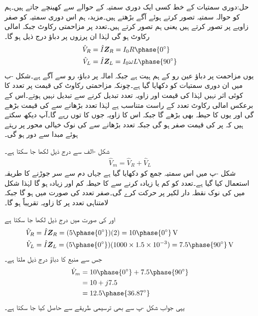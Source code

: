 حل:دوری سمتیات کے خط کسی ایک دوری سمتیہ کے حوالے سے کھینچے جاتے ہیں۔ہم  کو حوالہ سمتیہ تصور کرتے ہوئے آگے بڑھتے ہیں۔مزید، ہم اس دوری سمتیہ کو صفر زاویے پر تصور کرتے ہیں یعنی ہم  تصور کرتے ہیں۔تعدد  پر مزاحمتی رکاوٹ  جبکہ  امالی رکاوٹ  ہو گی لہٰذا ان پرزوں پر دباؤ درج ذیل ہو گا۔
\begin{align*}
\hat{V}_R&=\hat{I} \bZ_R=I_0 R \phase{0^{\circ}}\\
\hat{V}_L&=\hat{I} \bZ_L=I_0 \omega L \phase{90^{\circ}}
\end{align*}
یوں مزاحمت پر دباؤ عین رو کے ہم ہیت ہے جبکہ امالہ پر دباؤ، رو سے  آگے ہے۔شکل -ب میں ان دوری سمتیات کو دکھایا گیا ہے۔چونکہ مزاحمتی رکاوٹ کی قیمت پر تعدد کا کوئی اثر نہیں لہٰذا  کی قیمت اور زاویہ تعدد تبدیل کرنے سے تبدیل نہیں ہوتے۔اس کے برعکس امالی رکاوٹ تعدد کے راست متناسب ہے لہٰذا تعدد بڑھانے سے  کی قیمت بڑھے گی اور یوں  کا حیطہ بھی بڑھے گا جبکہ اس کا زاویہ جوں کا توں رہے گا۔آپ دیکھ سکتے ہیں کہ  پر  کی قیمت صفر ہو گی جبکہ تعدد بڑھانے سے  کی نوک خیالی محور پر رہتے ہوئے  مبدا سے دور ہو گی۔

شکل -الف سے درج ذیل لکھا جا سکتا ہے۔
\begin{align*}
\hat{V}_m=\hat{V}_R+\hat{V}_L
\end{align*}
شکل -پ میں اس سمتیہ جمع کو دکھایا گیا ہے جہاں دم سے سر جوڑنے کا طریقہ استعمال کیا گیا ہے۔تعدد کو کم یا زیادہ کرنے  سے  کا حیطہ کم اور زیادہ ہو گا لہٰذا شکل میں  کی نوک نقطہ دار لکیر پر حرکت کرے گی۔صفر تعدد کی صورت میں  ہو گا جبکہ لامتناہی  تعدد پر  کا زاویہ تقریباً  ہو گا۔
 
 اور  کی صورت میں درج ذیل لکھا جا سکتا ہے
\begin{align*}
\hat{V}_R&=\hat{I} \bZ_R=(5\phase{0^{\circ}})(2)=10\phase{0^{\circ}} \, \si{\volt}\\
\hat{V}_L&=\hat{I} \bZ_L=(5\phase{0^{\circ}})(1000 \times 1.5\times 10^{-3})=7.5\phase{90^{\circ}}\, \si{\volt}
\end{align*}
جس سے منبع کا دباؤ درج ذیل ملتا ہے۔
\begin{align*}
\hat{V}_m&=10\phase{0^{\circ}}+7.5\phase{90^{\circ}}\\
&=10+j7.5\\
&=12.5\phase{36.87^{\circ}}
\end{align*}
یہی جواب شکل -پ سے  بھی ترسیمی طریقے سے حاصل کیا جا سکتا ہے۔


